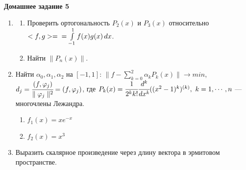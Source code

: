 \documentclass[12pt]{article}
\theoremstyle{definition}
\numberwithin{equation}{section}
\begin{document}
	\textbf{Домашнее задание 5}\begin{enumerate}
		\item
		\begin{enumerate}
			\item Проверить ортогональность $P_2(x)$ и $P_3(x)$ относительно $<f, g> =\\= \int\limits_{-1}^1 f(x)g(x)\,dx$.
			\item Найти $\parallel P_n(x) \parallel$.
		\end{enumerate}
		\item
		Найти $\alpha_0, \alpha_1, \alpha_2$ на $[-1, 1]$: $\parallel f - \sum\limits_{k=0}^2 \alpha_kP_k(x) \parallel \to min$, $d_j=\cfrac{(f, \varphi_j)}{\parallel \varphi_j \parallel^2} = (f, \varphi_j)$, где $P_k(x)=\cfrac{1}{2^k k!}\cfrac{d^k}{dx^k}((x^2-1)^k)^{(k)},~k=1,\cdots, n$ --- многочлены Лежандра.
		\begin{enumerate}
			\item $f_1(x)=xe^{-x}$
			\item $f_2(x)=x^3$\\
		\end{enumerate}
		\item
		Выразить скалярное произведение через длину вектора в эрмитовом пространстве.\end{enumerate}
\end{document}

